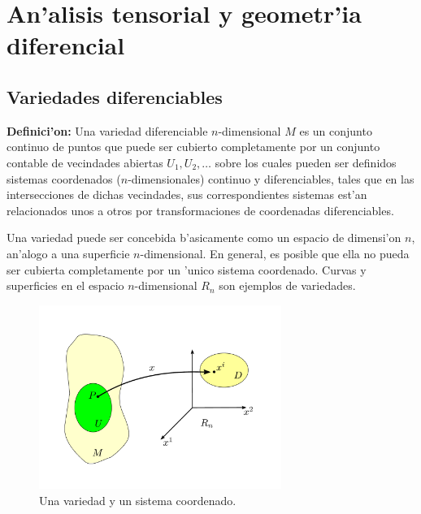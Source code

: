 \chapter{An'alisis tensorial y geometr'ia diferencial}\label{cap:tensores}

\section{Variedades diferenciables}

\textbf{Definici'on:} Una variedad diferenciable $n$-dimensional $M$ es
un conjunto continuo de puntos que puede ser cubierto completamente por un
conjunto contable de vecindades abiertas $U_1, U_2,\dots$ sobre los cuales pueden ser definidos sistemas coordenados ($n$-dimensionales) continuo y diferenciables, tales que en las intersecciones de dichas vecindades, sus correspondientes sistemas est'an relacionados unos a otros por transformaciones de coordenadas diferenciables.

Una variedad puede ser concebida b'asicamente como un espacio de
dimensi'on $n$, an'alogo a una superficie $n$-dimensional. En general,
es posible que ella no pueda ser cubierta completamente por un 'unico sistema coordenado.
Curvas y superficies en el espacio $n$-dimensional $R_n$ son ejemplos de variedades.
\begin{center}
\begin{figure}[H]
\centerline{\includegraphics[height=6cm]{fig/fig-coordenadas.pdf}}
\caption{Una variedad y un sistema coordenado.}
\label{1-1}
\end{figure}
\end{center}

